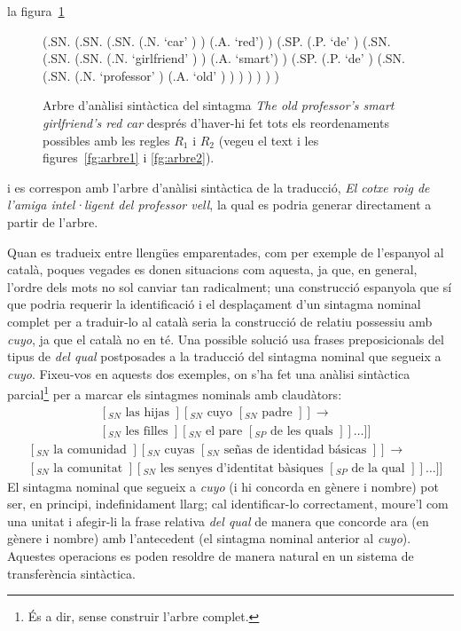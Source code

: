 la figura~\ref{fg:arbre3}
\begin{figure}
\begin{center}
\begin{parsetree}
(.SN. 
     (.SN.  (.SN. (.N. `car' ) ) (.A. `red') ) 
     (.SP. 
            (.P. `de' )
            (.SN. 
                  (.SN. (.SN. (.N. `girlfriend' ) ) (.A. `smart')  )
                  (.SP. 
                   (.P. `de' )
                   (.SN.  (.SN. (.N. `professor' )  (.A. `old' ) )
                   )
                  )
            )
     )
)                  
\end{parsetree}
\end{center}
\caption{Arbre d'anàlisi sintàctica del sintagma \emph{The old
    professor's smart girlfriend's red car} després d'haver-hi fet
  tots els reordenaments possibles amb les regles $R_1$ i $R_2$ (vegeu
  el text i les figures~\protect\ref{fg:arbre1} i
  \protect\ref{fg:arbre2}).}
\label{fg:arbre3}
\end{figure}
i es correspon amb l'arbre d'anàlisi sintàctica de la traducció,
\emph{El cotxe roig de l'amiga intel·ligent del professor vell}, la
qual es podria generar directament a partir de l'arbre.

Quan es tradueix entre llengües emparentades, com per exemple de
l'espanyol al català, poques vegades es donen situacions com aquesta,
ja que, en general, l'ordre dels mots no sol canviar tan radicalment;
una construcció espanyola que sí que podria requerir la identificació
i el desplaçament d'un sintagma nominal complet per a traduir-lo al
català seria la construcció de relatiu possessiu amb \emph{cuyo}, ja
que el català no en té. Una possible solució usa frases preposicionals
del tipus de \emph{del qual} postposades a la traducció del sintagma
nominal que segueix a \emph{cuyo}. Fixeu-vos en aquests dos exemples,
on s'ha fet una anàlisi sintàctica parcial\footnote{És a dir, sense
  construir l'arbre complet.}  per a marcar els sintagmes nominals amb
claudàtors:
$$\begin{array}{ll}
& [_{SN} \mbox{ las hijas }] [_{SN} \mbox{ cuyo } [_{SN} \mbox{ padre } ] ] 
\rightarrow \\   &
[_{SN} \mbox{ les filles } ] [_{SN}
\mbox{ el pare } [_{SP} \mbox{ de les quals } ] ] \ldots ] ] 
\end{array}
$$
$$
\begin{array}{ll}
& [_{SN} \mbox{ la comunidad }] [_{SN} \mbox{ cuyas } [_{SN} \mbox{ se\~{n}as de
identidad básicas } ] ]
\rightarrow \\  &
[_{SN} \mbox{ la comunitat }] [_{SN}
\mbox{ les senyes d'identitat bàsiques } [_{SP} \mbox{ de la qual } ] ] \ldots ] ] 
\end{array}
$$
El sintagma nominal que segueix a \emph{cuyo} (i hi concorda en gènere
i nombre) pot ser, en principi, indefinidament llarg; cal
identificar-lo correctament, moure'l com una unitat i afegir-li la
frase relativa \emph{del qual} de manera que concorde ara (en gènere i
nombre) amb l'antecedent (el sintagma nominal anterior al
\emph{cuyo}). Aquestes operacions es poden resoldre de manera natural
en un sistema de transferència sintàctica.

